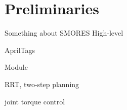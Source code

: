 \section{Preliminaries}\label{prelim}

Something about SMORES
High-level

AprilTags~\cite{Olson11}

Module

RRT, two-step planning

joint torque control